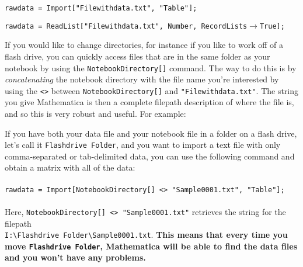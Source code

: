 \begin{example}
\texttt{rawdata = Import["Filewithdata.txt", "Table"];}
\end{example}
\begin{example}
\texttt{rawdata = ReadList["Filewithdata.txt", Number, RecordLists}$\to$\texttt{True];}
\end{example}

\begin{exercise}


If you would like to change directories, for instance if you like to work off of a flash drive, you can quickly access files that are in the same folder as your notebook by using the \texttt{NotebookDirectory[]} command. The way to do this is by {\it concatenating} the notebook directory with the file name you're interested by using the \texttt{<>} between \texttt{NotebookDirectory[]} and \texttt{"Filewithdata.txt"}. The string you give Mathematica is then a complete filepath description of where the file is, and so this is very robust and useful. For example:

\begin{example}
If you have both your data file and your notebook file in a folder on a flash drive, let's call it \texttt{Flashdrive Folder}, and you want to import a text file with only comma-separated or tab-delimited data, you can use the following command and obtain a matrix with all of the data:\\\\
\texttt{rawdata = Import[NotebookDirectory[] <> "Sample0001.txt", "Table"];}\\ \\
Here, \texttt{NotebookDirectory[] <> "Sample0001.txt"} retrieves the string for the filepath \\ \texttt{I:\textbackslash Flashdrive Folder\textbackslash Sample0001.txt}. {\bf This means that every time you move \texttt{Flashdrive Folder}, Mathematica will be able to find the data files and you won't have any problems.}


\end{example}
\end{exercise}
